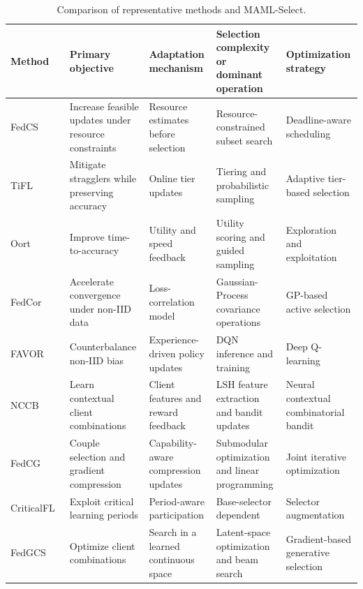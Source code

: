 \documentclass[journal]{IEEEtran}
\begin{document}
\begin{table}[!t]
    \color{blue}
    \caption{Comparison of representative methods and MAML-Select.}
    \label{tab:related_work_comparison}
    \centering
    \scriptsize
    \setlength{\tabcolsep}{3pt}
    \renewcommand{\arraystretch}{0.98}
    \begin{tabularx}{\textwidth}{lXXXX}
        \toprule
        \textbf{Method} & \textbf{Primary objective} & \textbf{Adaptation mechanism} & \textbf{Selection complexity or dominant operation} & \textbf{Optimization strategy} \\
        \midrule
        FedCS~\cite{nishio2019client} & Increase feasible updates under resource constraints & Resource estimates before selection & Resource-constrained subset search & Deadline-aware scheduling \\
        TiFL~\cite{chai2020tifl} & Mitigate stragglers while preserving accuracy & Online tier updates & Tiering and probabilistic sampling & Adaptive tier-based selection \\
        Oort~\cite{lai2021oort} & Improve time-to-accuracy & Utility and speed feedback & Utility scoring and guided sampling & Exploration and exploitation \\
        FedCor~\cite{tang2022fedcor} & Accelerate convergence under non-IID data & Loss-correlation model & Gaussian-Process covariance operations & GP-based active selection \\
        FAVOR~\cite{wang2020optimizing} & Counterbalance non-IID bias & Experience-driven policy updates & DQN inference and training & Deep Q-learning \\
        NCCB~\cite{pan2024contextual} & Learn contextual client combinations & Client features and reward feedback & LSH feature extraction and bandit updates & Neural contextual combinatorial bandit \\
        FedCG~\cite{xu2024federated} & Couple selection and gradient compression & Capability-aware compression updates & Submodular optimization and linear programming & Joint iterative optimization \\
        CriticalFL~\cite{yan2023criticalfl} & Exploit critical learning periods & Period-aware participation & Base-selector dependent & Selector augmentation \\
        FedGCS~\cite{ning2024fedgcs} & Optimize client combinations & Search in a learned continuous space & Latent-space optimization and beam search & Gradient-based generative selection \\

\end{tabularx}
\end{table}
\end{document}

